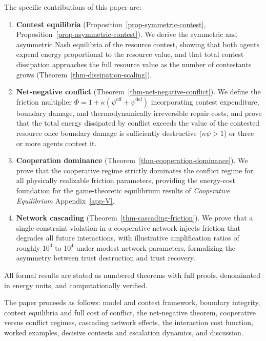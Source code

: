 \documentclass[11pt]{article}
\theoremstyle{plain}
\theoremstyle{definition}
\theoremstyle{remark}
\begin{document}
The specific contributions of this paper are:

\begin{enumerate}
\def\labelenumi{\arabic{enumi}.}
\item
  \textbf{Contest equilibria} (Proposition~\ref{prop-symmetric-contest},
  Proposition~\ref{prop-asymmetric-contest}). We derive the symmetric
  and asymmetric Nash equilibria of the resource contest, showing that
  both agents expend energy proportional to the resource value, and that
  total contest dissipation approaches the full resource value as the
  number of contestants grows (Theorem~\ref{thm-dissipation-scaling}).
\item
  \textbf{Net-negative conflict}
  (Theorem~\ref{thm-net-negative-conflict}). We define the friction
  multiplier
  \(\Phi = 1 + \kappa(\psi^{\text{off}} + \psi^{\text{def}})\)
  incorporating contest expenditure, boundary damage, and
  thermodynamically irreversible repair costs, and prove that the total
  energy dissipated by conflict exceeds the value of the contested
  resource once boundary damage is sufficiently destructive
  (\(\kappa\psi > 1\)) or three or more agents contest it.
\item
  \textbf{Cooperation dominance}
  (Theorem~\ref{thm-cooperation-dominance}). We prove that the
  cooperative regime strictly dominates the conflict regime for all
  physically realizable friction parameters, providing the energy-cost
  foundation for the game-theoretic equilibrium results of
  \emph{Cooperative Equilibrium} Appendix~\ref{app-V}.
\item
  \textbf{Network cascading} (Theorem~\ref{thm-cascading-friction}). We
  prove that a single constraint violation in a cooperative network
  injects friction that degrades all future interactions, with
  illustrative amplification ratios of roughly \(10^3\) to \(10^4\)
  under modest network parameters, formalizing the asymmetry between
  trust destruction and trust recovery.
\end{enumerate}

All formal results are stated as numbered theorems with full proofs,
denominated in energy units, and computationally verified.

The paper proceeds as follows: model and contest framework, boundary
integrity, contest equilibria and full cost of conflict, the
net-negative theorem, cooperative versus conflict regimes, cascading
network effects, the interaction cost function, worked examples,
decisive contests and escalation dynamics, and discussion.
\end{document}

